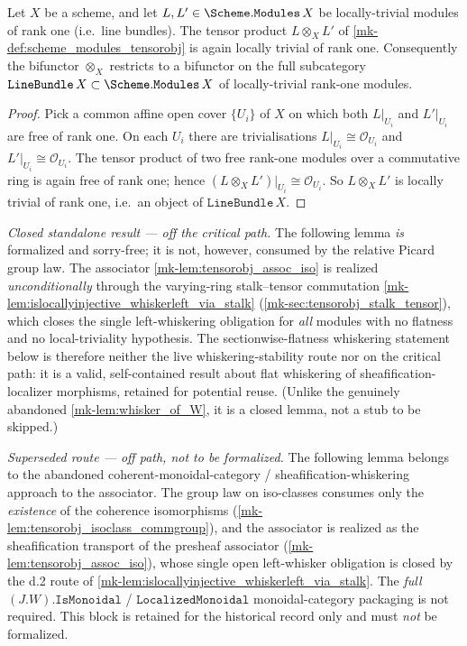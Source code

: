 \begin{lemma}\label{mk-lem:tensorobj_preserves_locally_trivial}
  \leanok

  Let \(X\) be a scheme, and let
  \(L, L' \in \Scheme.\mathtt{Modules}\,X\) be locally-trivial modules of
  rank one (i.e.\ line bundles). The tensor product \(L \otimes_X L'\) of
  \ref{mk-def:scheme_modules_tensorobj} is again locally trivial of rank
  one. Consequently the bifunctor \(\otimes_X\) restricts to a bifunctor
  on the full subcategory \(\texttt{LineBundle}\,X \subset \Scheme.\mathtt{Modules}\,X\)
  of locally-trivial rank-one modules.
\end{lemma}

\begin{proof}
  \leanok


Pick a common affine open cover \(\{U_i\}\) of \(X\) on which both
  \(L|_{U_i}\) and \(L'|_{U_i}\) are free of rank one. On each \(U_i\)
  there are trivialisations \(L|_{U_i} \cong \mathcal{O}_{U_i}\) and
  \(L'|_{U_i} \cong \mathcal{O}_{U_i}\). The tensor product of two free
  rank-one modules over a commutative ring is again free of rank one;
  hence \((L \otimes_X L')|_{U_i} \cong \mathcal{O}_{U_i}\). So
  \(L \otimes_X L'\) is locally trivial of rank one, i.e.\ an object of
  \(\texttt{LineBundle}\,X\).
\end{proof}

\emph{Closed standalone result --- off the critical path.} The following lemma
\emph{is} formalized and sorry-free; it is not, however, consumed by the relative
Picard group law. The associator \ref{mk-lem:tensorobj_assoc_iso} is realized
\emph{unconditionally} through the varying-ring stalk--tensor commutation
\ref{mk-lem:islocallyinjective_whiskerleft_via_stalk}
(\ref{mk-sec:tensorobj_stalk_tensor}), which closes the single left-whiskering
obligation for \emph{all} modules with no flatness and no local-triviality
hypothesis. The sectionwise-flatness whiskering statement below is therefore
neither the live whiskering-stability route nor on the critical path: it is a valid,
self-contained result about flat whiskering of sheafification-localizer morphisms,
retained for potential reuse. (Unlike the genuinely abandoned
\ref{mk-lem:whisker_of_W}, it is a closed lemma, not a stub to be skipped.)

\emph{Superseded route --- off path, not to be formalized.} The following lemma
belongs to the abandoned coherent-monoidal-category / sheafification-whiskering
approach to the associator. The group law on iso-classes consumes only the
\emph{existence} of the coherence isomorphisms (\ref{mk-lem:tensorobj_isoclass_commgroup}),
and the associator is realized as the sheafification transport of the presheaf
associator (\ref{mk-lem:tensorobj_assoc_iso}), whose single open left-whisker obligation
is closed by the d.2 route of \ref{mk-lem:islocallyinjective_whiskerleft_via_stalk}. The
\emph{full} \((J.W).\mathtt{IsMonoidal}\) / \(\mathtt{LocalizedMonoidal}\)
monoidal-category packaging is not required. This block is retained for the historical
record only and must \emph{not} be formalized.

